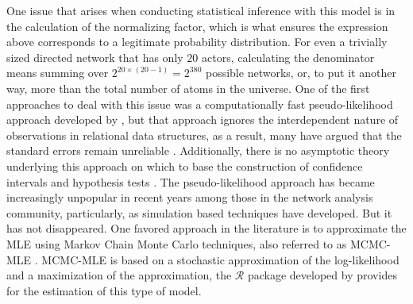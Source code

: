 One issue that arises when conducting statistical inference with this model is in the calculation of the normalizing factor, which is what ensures the expression above corresponds to a legitimate probability distribution. For even a trivially sized directed network that has only $20$ actors, calculating the denominator means summing over $2^{20\times(20-1)} = 2^{380}$ possible networks, or, to put it another way, more than the total number of atoms in the universe. One of the first approaches to deal with this issue was a computationally fast pseudo-likelihood approach developed by \citet{strauss:iked:1990}, but that approach ignores the interdependent nature of observations in relational data structures, as a result, many have argued that the standard errors remain unreliable \citep{lubbers:snijders:2007,robins:etal:2007a,vanduijn:etal:2009}. Additionally, there is no asymptotic theory underlying this approach on which to base the construction of confidence intervals and hypothesis tests \citep{kolaczyk:2009}. The pseudo-likelihood approach has became increasingly unpopular in recent years among those in the network analysis community, particularly, as simulation based techniques have developed. But it has not disappeared.  One favored approach in the literature is to approximate the MLE using Markov Chain Monte Carlo techniques, also referred to as MCMC-MLE \citep{geyer:thompson:1992,snijders:2002,handcock:2003b}. MCMC-MLE is based on a stochastic approximation of the log-likelihood and a maximization of the approximation, the  $\mathcal{R}$ package developed by \citet{hunter:etal:2008} provides for the estimation of this type of model.

